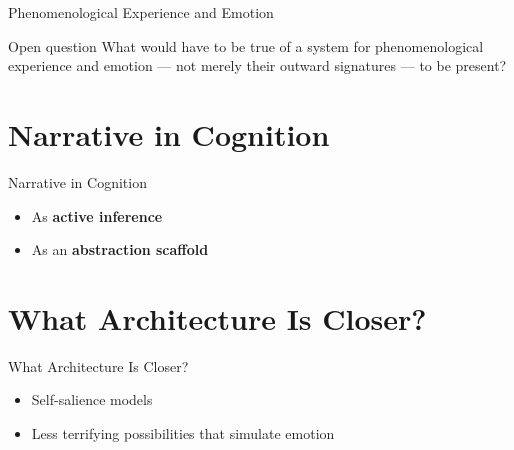 \documentclass[aspectratio=169]{beamer}
\begin{document}
\begin{frame}{Phenomenological Experience and Emotion}
  \begin{block}{Open question}
    What would have to be true of a system for phenomenological experience and emotion --- not merely their outward signatures --- to be present?
  \end{block}

\end{frame}

\section{Narrative in Cognition}

\begin{frame}{Narrative in Cognition \parencite{miller2024narrativity}}
  \begin{itemize}
    \item<1-> As \textbf{active inference}
    \item<2-> As an \textbf{abstraction scaffold}
  \end{itemize}
\end{frame}

\section{What Architecture Is Closer?}

\begin{frame}{What Architecture Is Closer?}
  \begin{itemize}
    \item Self-salience models
    \item Less terrifying possibilities that simulate emotion
  \end{itemize}

\end{frame}

\end{document}
